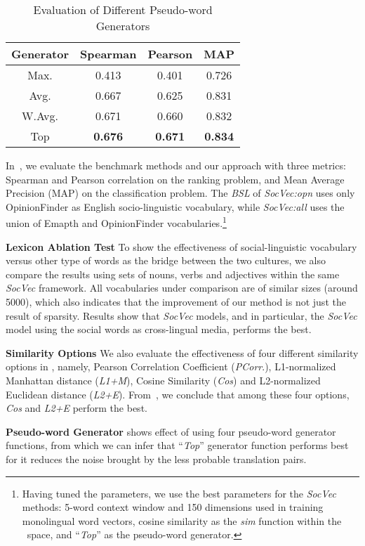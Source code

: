 \begin{table}[th]
	\centering
	\scriptsize
	\caption{{\small Evaluation of Different Pseudo-word Generators}\vspace{-10pt}}
	\begin{tabular}{c|c|c|c}
		\textbf{Generator} & \textbf{Spearman} & \textbf{Pearson}   & \textbf{MAP} \\  \hline
		Max. & 0.413 & 0.401 & 0.726\\ 
		Avg. & 0.667 & 0.625 & 0.831\\ 
		W.Avg. & 0.671 & 0.660 & 0.832 \\  
		Top & \textbf{0.676} & \textbf{0.671} & \textbf{0.834} \\ \hline
	\end{tabular}
	\label{tab:mcdne_res_3}
\end{table}

In~, we evaluate the benchmark methods and our approach with three metrics: Spearman and 
Pearson correlation on the ranking problem, and Mean Average Precision (MAP) on the classification problem. 
The \textit{BSL} of \textit{SocVec:opn} uses only OpinionFinder as English socio-linguistic vocabulary, while \textit{SocVec:all} uses the union of Emapth and OpinionFinder vocabularies.\footnote{Having tuned the  parameters, we use the best parameters for the \textit{SocVec} methods: 5-word context window and 
150 dimensions used in training monolingual word vectors,
cosine similarity as the \textit{sim} function within the 
\textit{\socvec}~space, and ``\textit{Top}'' as the pseudo-word generator.} 

\textbf{Lexicon Ablation Test} To show the effectiveness of social-linguistic vocabulary versus other type
of words as the bridge between the two cultures, we also compare the
results using sets of nouns, verbs and adjectives within the 
same \textit{SocVec} framework.
All vocabularies under comparison are of similar sizes 
(around 5000), which also indicates that the improvement of our method 
is not just the result of sparsity.
Results show that \textit{SocVec} models, and in particular, the \textit{SocVec} model using the social words as cross-lingual media, performs the best. 

\textbf{Similarity Options} We also evaluate the effectiveness of four different similarity options in 
\textit{\socvec}, namely, Pearson Correlation Coefficient 
(\textit{PCorr}.), L1-normalized Manhattan distance (\textit{L1+M}), 
Cosine Similarity (\textit{Cos}) and  L2-normalized Euclidean distance (\textit{L2+E}).
From~, we conclude that among these four options, \textit{Cos} and \textit{L2+E} perform the best. 

\textbf{Pseudo-word Generator} 
 shows effect of using four pseudo-word generator functions, from which we can infer that ``\textit{Top}'' generator function performs best for 
it reduces the noise brought by the less probable translation pairs. 